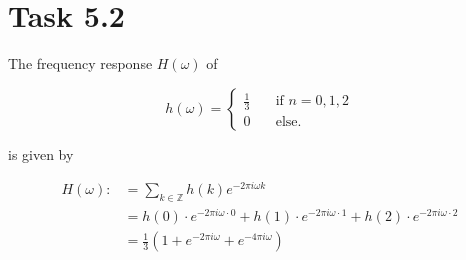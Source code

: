 \documentclass[12pt]{article}
\begin{document}
\section*{Task 5.2}
The frequency response $H(\omega)$ of

\[
h(\omega) =
    \begin{cases}
        \frac{1}{3} & \quad\text{if } n=0,1,2\\
        0 &\quad\text{else.}
    \end{cases}
\]

is given by

\begin{align*}
    H(\omega) :&= \sum_{k \in \mathbb{Z}} h(k)e^{-2 \pi i \omega k}\\
    &= h(0) \cdot e^{-2 \pi i \omega \cdot 0} + h(1) \cdot e^{-2 \pi i \omega \cdot 1} + h(2) \cdot e^{-2 \pi i \omega \cdot 2}\\
    &= \frac{1}{3} (1 + e^{-2 \pi i \omega} + e^{-4 \pi i \omega})
\end{align*}
\end{document}
